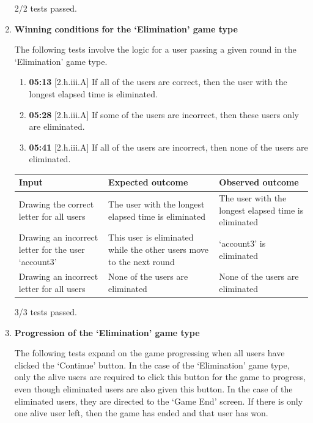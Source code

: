 \documentclass{article}
\begin{document}
\begin{enumerate}
    2/2 tests passed. \\

    \item \textbf{Winning conditions for the `Elimination' game type}
    
    The following tests involve the logic for a user passing a given round in the `Elimination' game type.

    \begin{enumerate}
        \item \textbf{05:13} [2.h.iii.A] If all of the users are correct, then the user with the longest elapsed time is eliminated.
        \item \textbf{05:28} [2.h.iii.A] If some of the users are incorrect, then these users only are eliminated.
        \item \textbf{05:41} [2.h.iii.A] If all of the users are incorrect, then none of the users are eliminated.
    \end{enumerate}

    \begin{table}[H]
    \centering
        \begin{tabularx}{\textwidth}{|L|L|L|}
        \hline
        \textbf{Input} & \textbf{Expected outcome} & \textbf{Observed outcome} \\\hline
        Drawing the correct letter for all users & The user with the longest elapsed time is eliminated & The user with the longest elapsed time is eliminated \\\hline
        Drawing an incorrect letter for the user `account3' & This user is eliminated while the other users move to the next round & `account3' is eliminated \\\hline
        Drawing an incorrect letter for all users & None of the users are eliminated & None of the users are eliminated \\\hline
        \end{tabularx}
    \end{table}

    3/3 tests passed. \\

    \item \textbf{Progression of the `Elimination' game type}
    
    The following tests expand on the game progressing when all users have clicked the `Continue' button. In the case of the `Elimination' game type, only the alive users are required to click this button for the game to progress, even though eliminated users are also given this button. In the case of the eliminated users, they are directed to the `Game End' screen. If there is only one alive user left, then the game has ended and that user has won.


\end{enumerate}
\end{document}
